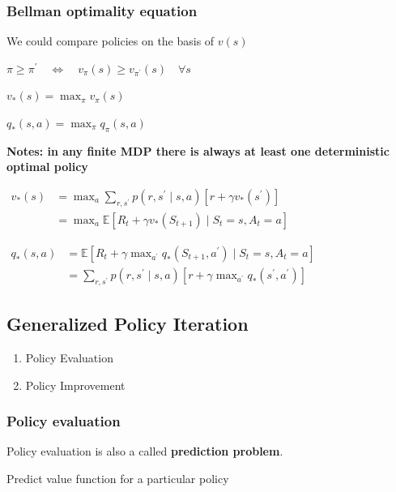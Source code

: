\documentclass[a4paper,12pt]{article}
\begin{document}
	\subsubsection{Bellman optimality equation}
	
	We could compare policies on the basis of $v(s)$
	
	$\pi \geq \pi^{\prime} \quad \Leftrightarrow \quad v_\pi(s) \geq v_{\pi^{\prime}}(s) \quad \forall s$
	
	$v_*(s)=\max _\pi v_\pi(s)$
	
	$q_*(s, a)=\max _\pi q_\pi(s, a)$
	
	\textbf{Notes: in any finite MDP there is always at least one deterministic optimal policy}
	
	$\begin{aligned} v_*(s) & =\max _a \sum_{r, s^{\prime}} p\left(r, s^{\prime} \mid s, a\right)\left[r+\gamma v_*\left(s^{\prime}\right)\right] \\ & =\max _a \mathbb{E}\left[R_t+\gamma v_*\left(S_{t+1}\right) \mid S_t=s, A_t=a\right]\end{aligned}$
	
	$\begin{aligned} q_*(s, a) & =\mathbb{E}\left[R_t+\gamma \max _{a^{\prime}} q_*\left(S_{t+1}, a^{\prime}\right) \mid S_t=s, A_t=a\right] \\ & =\sum_{r, s^{\prime}} p\left(r, s^{\prime} \mid s, a\right)\left[r+\gamma \max _{a^{\prime}} q_*\left(s^{\prime}, a^{\prime}\right)\right]\end{aligned}$
	
	   
	 \subsection{Generalized Policy Iteration}
	 
	 \begin{enumerate}
	 	\item Policy Evaluation 
	 	\item Policy Improvement
	 \end{enumerate}
 	
 	\subsubsection{Policy evaluation}
 	
 	Policy evaluation is also a called \textbf{prediction problem}.
 	
 	Predict value function for a particular policy
 	
\end{document}
